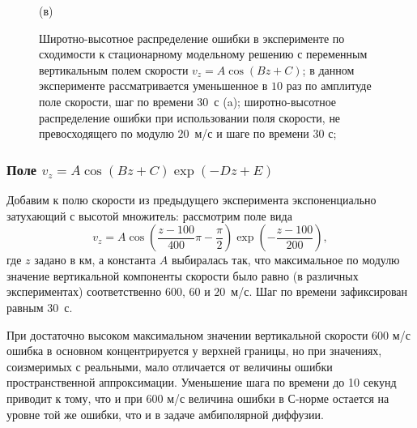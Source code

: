 \documentclass[14pt, a4paper]{extarticle}
\begin{document}
\begin{figure}[H]

(в)

\caption{Широтно-высотное распределение ошибки в эксперименте по сходимости к стационарному модельному решению с переменным вертикальным полем скорости $v_z = A\cos(Bz+C)$; в данном эксперименте рассматривается уменьшенное в $10$ раз по амплитуде поле скорости, шаг по времени $30$~с (a); широтно-высотное распределение ошибки при использовании поля скорости, не превосходящего по модулю $20$~м/с и шаге по времени $30$ с;}
\end{figure}




\subsubsection{Поле $v_z = A\cos(Bz+C)\exp(-Dz+E)$}

Добавим к полю скорости из предыдущего эксперимента экспоненциально затухающий с высотой множитель: рассмотрим поле вида  
\begin{equation}\label{cosexp}
v_z = A\cos\left(\dfrac{z-100}{400}\pi - \dfrac{\pi}{2}\right)\exp\left(-\dfrac{z-100}{200}\right),
\end{equation}
где $z$ задано в км, а константа $A$ выбиралась так, что максимальное по модулю значение вертикальной компоненты скорости было равно (в различных экспериментах) соответственно $600$, $60$ и $20$~м/с. Шаг по времени зафиксирован равным $30$~с.

При достаточно высоком максимальном значении вертикальной скорости 600 м/с ошибка в основном концентрируется у верхней границы, но при значениях, соизмеримых с реальными, мало отличается от величины ошибки пространственной аппроксимации.
Уменьшение шага по времени до 10 секунд приводит к тому, что и при 600 м/с величина ошибки в С-норме остается на уровне той же ошибки, что и в задаче амбиполярной диффузии.
\end{document}
